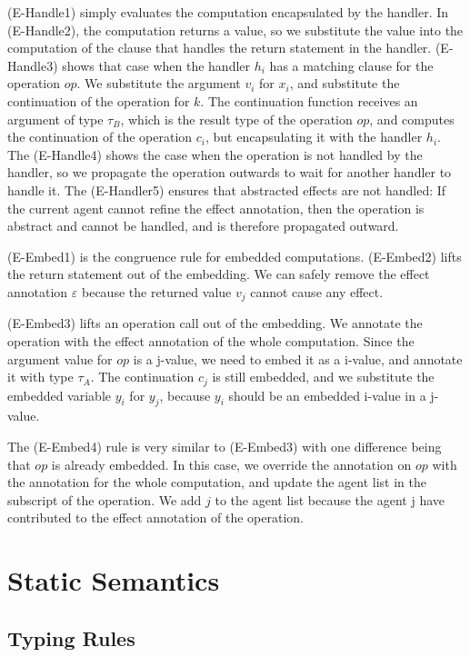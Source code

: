 (E-Handle1) simply evaluates the computation encapsulated by the handler. In (E-Handle2), the computation returns a value, so we substitute the value into the computation of the clause that handles the return statement in the handler. (E-Handle3) shows that case when the handler $h_i$ has a matching clause for the operation $op$. We substitute the argument $v_i$ for $x_i$, and substitute the continuation of the operation for $k$. The continuation function receives an argument of type $\tau_B$, which is the result type of the operation $op$, and computes the continuation of the operation $c_i$, but encapsulating it with the handler $h_i$. The (E-Handle4) shows the case when the operation is not handled by the handler, so we propagate the operation outwards to wait for another handler to handle it. The (E-Handler5) ensures that abstracted effects are not handled: If the current agent cannot refine the effect annotation, then the operation is abstract and cannot be handled, and is therefore propagated outward. 

(E-Embed1) is the congruence rule for embedded computations. (E-Embed2) lifts the return statement out of the embedding. We can safely remove the effect annotation $\varepsilon$ because the returned value $v_j$ cannot cause any effect. 

(E-Embed3) lifts an operation call out of the embedding. We annotate the operation with the effect annotation of the whole computation. Since the argument value for $op$ is a j-value, we need to embed it as a i-value, and annotate it with type $\tau_A$. The continuation $c_j$ is still embedded, and we substitute the embedded variable $y_i$ for $y_j$, because $y_i$ should be an embedded i-value in a j-value.

The (E-Embed4) rule is very similar to (E-Embed3) with one difference being that $op$ is already embedded. In this case, we override the annotation on $op$ with the annotation for the whole computation, and update the agent list in the subscript of the operation. We add $j$ to the agent list because the agent j have contributed to the effect annotation of the operation.

\section{Static Semantics}
\subsection{Typing Rules}

